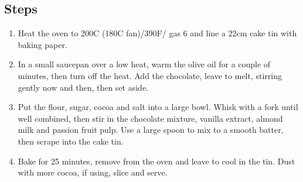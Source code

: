 \documentclass{book}
\begin{document}
\subsection*{Steps}
\begin{enumerate}
\item Heat the oven to 200C (180C fan)/390F/ gas 6 and line a 22cm cake tin with baking paper.
\item In a small saucepan over a low heat, warm the olive oil for a couple of minutes, then turn off the heat. Add the chocolate, leave to melt, stirring gently now and then, then set aside.
\item Put the flour, sugar, cocoa and salt into a large bowl. Whisk with a fork until well combined, then stir in the chocolate mixture, vanilla extract, almond milk and passion fruit pulp. Use a large spoon to mix to a smooth batter, then scrape into the cake tin.
\item Bake for 25 minutes, remove from the oven and leave to cool in the tin. Dust with more cocoa, if using, slice and serve.
\end{enumerate}
\newpage
\end{document}
